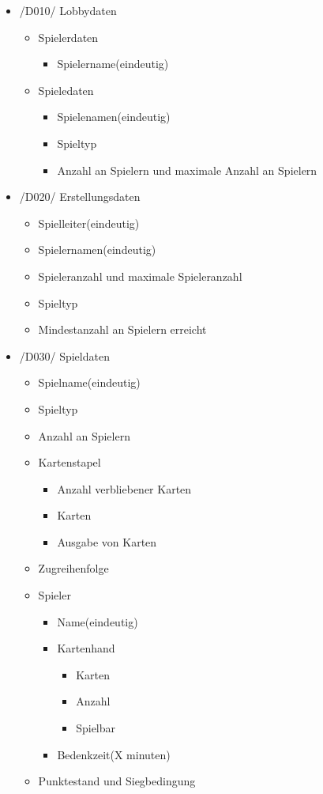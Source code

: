 \documentclass{article}
\begin{document}
\begin{itemize}
	\item /D010/ \gls{Lobby}daten
	 \begin{itemize}
	 	\item Spielerdaten
	 	\begin{itemize}
	 		\item Spielername(eindeutig)
	 	\end{itemize}
	 	\item Spieledaten
	 	\begin{itemize}
	 		\item Spielenamen(eindeutig)
	 		\item Spieltyp
	 		\item Anzahl an Spielern und maximale Anzahl an Spielern
	 	\end{itemize}
	 \end{itemize}
	 \item /D020/ Erstellungsdaten
	 \begin{itemize}
	 	\item \gls{Spielleiter}(eindeutig)
	 	\item Spielernamen(eindeutig)
	 	\item Spieleranzahl und maximale Spieleranzahl
	 	\item Spieltyp
	 	\item Mindestanzahl an Spielern erreicht
	 \end{itemize}
	 \item /D030/ Spieldaten
	 \begin{itemize}
	 	\item Spielname(eindeutig)
	 	\item Spieltyp
	 	\item Anzahl an Spielern
	 	\item Kartenstapel
	 	\begin{itemize}
	 		\item Anzahl verbliebener Karten
	 		\item Karten
	 		\item Ausgabe von Karten
	 	\end{itemize}
	 	\item Zugreihenfolge
	 	\item Spieler
	 	\begin{itemize}
	 		\item Name(eindeutig)
	 		\item Kartenhand
	 		\begin{itemize}
	 			\item Karten
	 			\item Anzahl
	 			\item Spielbar
	 		\end{itemize}	 
	 		\item Bedenkzeit(X minuten)		
	 	\end{itemize}
	 	\item Punktestand und Siegbedingung
	 \end{itemize}
\end{itemize}
\end{document}
